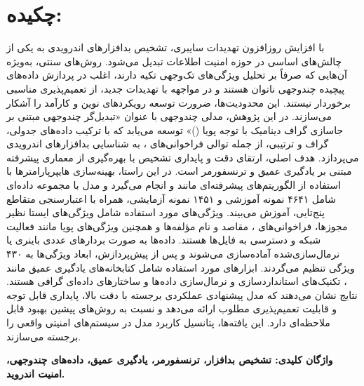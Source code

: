 \chapter*{\vspace{-2.38cm}\fontsize{17}{18}\selectfont \bfseries چکیده:}
\vspace{-1.5cm}\setlength{\parindent}{20pt}
{\fontsize{12}{12}\selectfont
با افزایش روزافزون تهدیدات سایبری، تشخیص بدافزارهای اندرویدی به یکی از چالش‌های اساسی در حوزه امنیت اطلاعات تبدیل می‌شود. روش‌های سنتی، به‌ویژه آن‌هایی که صرفاً بر تحلیل ویژگی‌های تک‌وجهی تکیه دارند، اغلب در پردازش داده‌های پیچیده چندوجهی ناتوان هستند و در مواجهه با تهدیدات جدید، از تعمیم‌پذیری مناسبی برخوردار نیستند. این محدودیت‌ها، ضرورت توسعه رویکردهای نوین و کارآمد را آشکار می‌سازند. در این پژوهش، مدلی چندوجهی با عنوان «تبدیل‌گر چندوجهی مبتنی بر جاسازی گراف دینامیک با توجه پویا ()» توسعه می‌یابد که با ترکیب داده‌های جدولی، گراف و ترتیبی، از جمله توالی فراخوانی‌های ، به شناسایی بدافزارهای اندرویدی می‌پردازد. هدف اصلی، ارتقای دقت و پایداری تشخیص با بهره‌گیری از معماری پیشرفته مبتنی بر یادگیری عمیق و ترنسفورمر است. در این راستا، بهینه‌سازی هایپرپارامترها با استفاده از الگوریتم‌های پیشرفته‌ای مانند  و  انجام می‌گیرد و مدل با مجموعه داده‌ای شامل ۴۶۴۱ نمونه آموزشی و ۱۴۵۱ نمونه آزمایشی، همراه با اعتبارسنجی متقاطع پنج‌تایی، آموزش می‌بیند. ویژگی‌های مورد استفاده شامل ویژگی‌های ایستا نظیر مجوزها، فراخوانی‌های ، مقاصد و نام مؤلفه‌ها و همچنین ویژگی‌های پویا مانند فعالیت شبکه و دسترسی به فایل‌ها هستند. داده‌ها به صورت بردارهای عددی باینری یا نرمال‌سازی‌شده آماده‌سازی می‌شوند و پس از پیش‌پردازش، ابعاد ویژگی‌ها به ۴۳۰ ویژگی تنظیم می‌گردند. ابزارهای مورد استفاده شامل کتابخانه‌های یادگیری عمیق مانند ، تکنیک‌های استانداردسازی و نرمال‌سازی داده‌ها و ساختارهای داده‌ای گرافی هستند. نتایج نشان می‌دهند که مدل پیشنهادی عملکردی برجسته با دقت بالا، پایداری قابل توجه و قابلیت تعمیم‌پذیری مطلوب ارائه می‌دهد و نسبت به روش‌های پیشین بهبود قابل ملاحظه‌ای دارد. این یافته‌ها، پتانسیل کاربرد مدل در سیستم‌های امنیتی واقعی را برجسته می‌سازند.
}

\par\vspace{.5cm}\setlength{\parindent}{0pt}
{\fontsize{13}{14}\selectfont\bfseries واژگان کلیدی: تشخیص بدافزار، ترنسفورمر، یادگیری عمیق، داده‌های چندوجهی، امنیت اندروید.}
